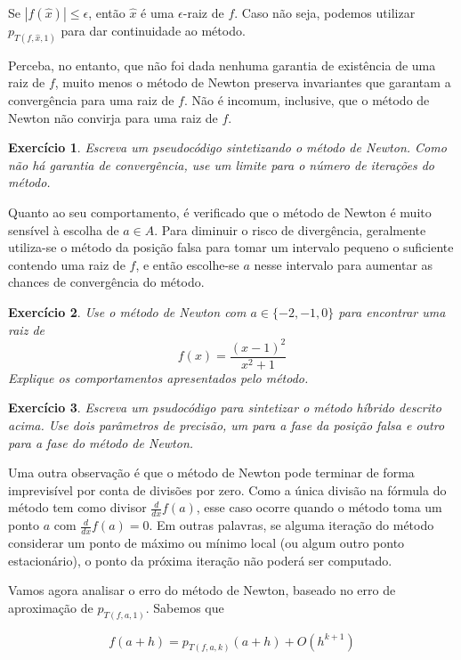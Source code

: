 \documentclass[]{article}
\newtheorem{exercicio}{Exercício}
\numberwithin{equation}{section}
\begin{document}
Se $|f(\hat{x})| \leq \epsilon$, então $\hat{x}$ é uma $\epsilon$-raiz
de $f$. Caso não seja, podemos utilizar $p_{T(f, \hat{x}, 1)}$ para
dar continuidade ao método.

Perceba, no entanto, que não foi dada nenhuma garantia de existência
de uma raiz de $f$, muito menos o método de Newton preserva
invariantes que garantam a convergência para uma raiz de $f$. Não é
incomum, inclusive, que o método de Newton não convirja para uma raiz
de $f$.

\begin{exercicio}
  Escreva um pseudocódigo sintetizando o método de Newton. Como não há
  garantia de convergência, use um limite para o número de iterações
  do método.
\end{exercicio}

Quanto ao seu comportamento, é verificado que o método de Newton é
muito sensível à escolha de $a \in A$. Para diminuir o risco de
divergência, geralmente utiliza-se o método da posição falsa para
tomar um intervalo pequeno o suficiente contendo uma raiz de $f$, e
então escolhe-se $a$ nesse intervalo para aumentar as chances de
convergência do método.

\begin{exercicio}
  Use o método de Newton com $a \in \{-2, -1, 0\}$ para encontrar uma
  raiz de $$f(x) = \frac{(x - 1)^2}{x^2 + 1}$$ Explique os
  comportamentos apresentados pelo método.
\end{exercicio}

\begin{exercicio}
  Escreva um psudocódigo para sintetizar o método híbrido descrito
  acima. Use dois parâmetros de precisão, um para a fase da posição
  falsa e outro para a fase do método de Newton.
\end{exercicio}

Uma outra observação é que o método de Newton pode terminar de forma
imprevisível por conta de divisões por zero. Como a única divisão na
fórmula do método tem como divisor $\frac{d}{dx} f(a)$, esse caso
ocorre quando o método toma um ponto $a$ com $\frac{d}{dx} f(a) =
0$. Em outras palavras, se alguma iteração do método considerar um
ponto de máximo ou mínimo local (ou algum outro ponto estacionário), o
ponto da próxima iteração não poderá ser computado.

Vamos agora analisar o erro do método de Newton, baseado no erro de
aproximação de $p_{T(f, a, 1)}$. Sabemos que

$$
f(a + h) = p_{T(f, a, k)}(a + h) + O(h^{k + 1})
$$
\end{document}
